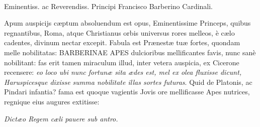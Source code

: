 \documentclass[a4paper, 11pt, oneside, polutonikogreek, latin]{article}
\begin{document}
\paragraph{}
Eminentiss. ac Reverendiss. Principi Francisco Barberino Cardinali.

Apum auspicijs cæptum absoluendum est opus, Eminentissime Princeps, quibus regnantibus, Roma, atque Christianus orbis universus rores melleos, è cælo cadentes, divinum nectar excepit. Fabula est Prænestæ tuæ fortes, quondam melle nobilitatas: BARBERINAE APES dulcioribus mellificantes favis, nunc sanè nobilitant: fas erit tamen miraculum illud, inter vetera auspicia, ex Cicerone recensere: \emph{eo loco ubi nunc fortunæ sita ædes est, mel ex olea fluxisse dicunt, Haruspicesque dixisse summa nobilitate illas sortes futuras}. Quid de Platonis, ac Pindari infantia? fama est quoque vagientis Jovis ore mellificasse Apes nutrices, regnique eius augures extitisse:

\emph{Dictæo Regem cæli pauere sub antro.}
\end{document}
